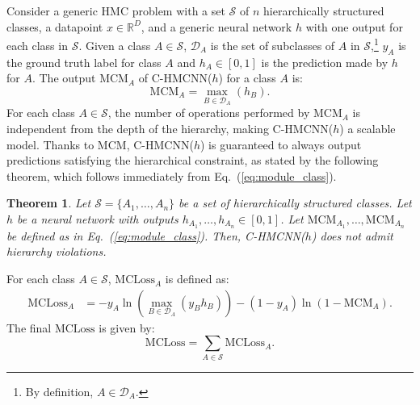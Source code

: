\documentclass{article}
\newcommand{\module}{\text{MCM}}
\newcommand{\loss}{\text{MCLoss}}
\newcommand{\system}[1]{C-HMCNN(#1)}
\newtheorem{theorem}{Theorem}[section]
\begin{document}
Consider a generic HMC problem with a set $\mathcal{S}$ of $n$ hierarchically structured classes, a datapoint $x \in \mathbb{R}^D$, and a generic neural network $h$ with one output for each class in $\mathcal{S}$. Given a class $A \in \mathcal{S}$, $\mathcal{D}_A$ is the set of subclasses of $A$ in $\mathcal{S}$,\footnote{By definition, $A \in \mathcal{D}_A$.} $y_A$ is the ground truth label for class $A$ and $h_A \in [0,1]$ is the prediction made by $h$ for $A$. 
The output $\module_A$ of \system{$h$} for a class $A$ is: 
\begin{equation}\label{eq:module_class}
   \module_A = \max_{B \in \mathcal{D}_A}(h_B).
\end{equation}
For each class $A \in \mathcal{S}$, the number of operations performed by $\module_A$ is independent from the depth of the hierarchy, making \system{$h$} a scalable model. Thanks to $\module$, \system{$h$} is guaranteed to always output predictions satisfying the hierarchical constraint, as stated by the following theorem, which follows immediately from Eq.~(\ref{eq:module_class}). 

\begin{theorem}\label{theorem}
Let $\mathcal{S} = \{A_1, \ldots, A_n\}$ be a set of hierarchically structured classes. Let $h$ be a neural network with outputs $h_{A_1}, \ldots, h_{A_n} \in [0,1]$. Let 
$\module_{A_1}, \ldots, \module_{A_n}$ be defined as in Eq.~(\ref{eq:module_class}).
Then, \system{$h$} does not admit hierarchy violations.
\end{theorem}

For each class $A \in \mathcal{S}$,  $\loss_A$ is defined as:
\begin{align*}\label{eq:loss_class}
    \loss_A & = -y_A\ln(\max_{B \in \mathcal{D}_A}(y_Bh_B)) - (1-y_A)\ln(1-\module_A) .\end{align*}
The final $\loss$ is given by:
\begin{equation}
    \loss = \sum_{A \in \mathcal{S}} \loss_A.
\end{equation}
\end{document}
